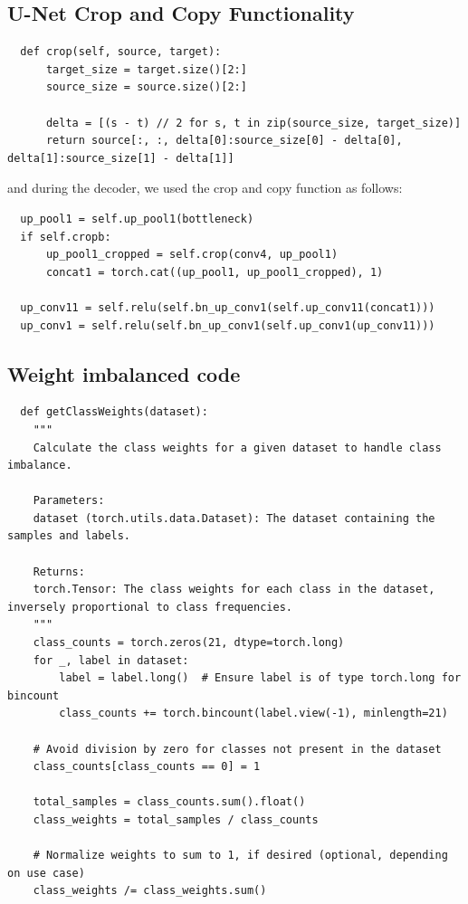 \documentclass{article}
\begin{document}
\subsection{U-Net Crop and Copy Functionality}
\label{sec:unet_crop_copy}
\begin{verbatim}
  def crop(self, source, target):
      target_size = target.size()[2:]
      source_size = source.size()[2:]

      delta = [(s - t) // 2 for s, t in zip(source_size, target_size)]
      return source[:, :, delta[0]:source_size[0] - delta[0], delta[1]:source_size[1] - delta[1]]
\end{verbatim}
and during the decoder, we used the crop and copy function as follows:
\begin{verbatim}
  up_pool1 = self.up_pool1(bottleneck)
  if self.cropb:
      up_pool1_cropped = self.crop(conv4, up_pool1)  
      concat1 = torch.cat((up_pool1, up_pool1_cropped), 1)   

  up_conv11 = self.relu(self.bn_up_conv1(self.up_conv11(concat1)))
  up_conv1 = self.relu(self.bn_up_conv1(self.up_conv1(up_conv11)))
\end{verbatim}

\subsection{Weight imbalanced code}
\label{sec:weight_imbalanced_code}
\begin{verbatim}
  def getClassWeights(dataset):
    """
    Calculate the class weights for a given dataset to handle class imbalance.

    Parameters:
    dataset (torch.utils.data.Dataset): The dataset containing the samples and labels.

    Returns:
    torch.Tensor: The class weights for each class in the dataset, inversely proportional to class frequencies.
    """
    class_counts = torch.zeros(21, dtype=torch.long)
    for _, label in dataset:
        label = label.long()  # Ensure label is of type torch.long for bincount
        class_counts += torch.bincount(label.view(-1), minlength=21)
    
    # Avoid division by zero for classes not present in the dataset
    class_counts[class_counts == 0] = 1
    
    total_samples = class_counts.sum().float()
    class_weights = total_samples / class_counts
    
    # Normalize weights to sum to 1, if desired (optional, depending on use case)
    class_weights /= class_weights.sum()
\end{verbatim}
\end{document}
